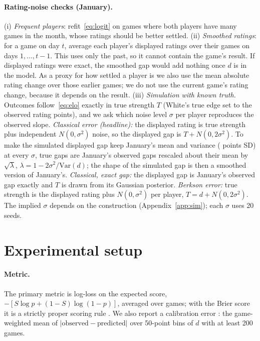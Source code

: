 \documentclass{article}
\begin{document}
\paragraph{Rating-noise checks (January).} (i) \emph{Frequent players}: refit~\eqref{eq:logit} on games where both players have many games in the month, whose ratings should be better settled. (ii) \emph{Smoothed ratings}: for a game on day $t$, average each player's displayed ratings over their games on days $1,\dots,t-1$. This uses only the past, so it cannot contain the game's result. If displayed ratings were exact, the smoothed gap would add nothing once $d$ is in the model. As a proxy for how settled a player is we also use the mean absolute rating change over those earlier games; we do not use the current game's rating change, because it depends on the result. (iii) \emph{Simulation with known truth.} Outcomes follow~\eqref{eq:elo} exactly in true strength $T$ (White's true edge set to the observed \simTrueEdgePts{} rating points), and we ask which noise level $\sigma$ per player reproduces the observed slope. \emph{Classical error (headline):} the displayed rating is true strength plus independent $N(0,\sigma^2)$ noise, so the displayed gap is $T + N(0, 2\sigma^2)$. To make the simulated displayed gap keep January's mean and variance (\gapSD{} points SD) at every $\sigma$, true gaps are January's observed gaps rescaled about their mean by $\sqrt{\lambda}$, $\lambda = 1 - 2\sigma^2/\mathrm{Var}(d)$; the shape of the simulated gap is then a smoothed version of January's. \emph{Classical, exact gap:} the displayed gap is January's observed gap exactly and $T$ is drawn from its Gaussian posterior. \emph{Berkson error:} true strength is the displayed rating plus $N(0,\sigma^2)$ per player, $T = d + N(0, 2\sigma^2)$. The implied $\sigma$ depends on the construction (Appendix~\ref{app:sim}); each $\sigma$ uses 20 seeds.

\section{Experimental setup}

\paragraph{Metric.} The primary metric is log-loss on the expected score, $-[S\log p+(1-S)\log(1-p)]$, averaged over games; with the Brier score it is a strictly proper scoring rule \citep{gneiting2007}. We also report a calibration error \citep{guo2017}: the game-weighted mean of $|\text{observed} - \text{predicted}|$ over 50-point bins of $d$ with at least 200 games.
\end{document}
